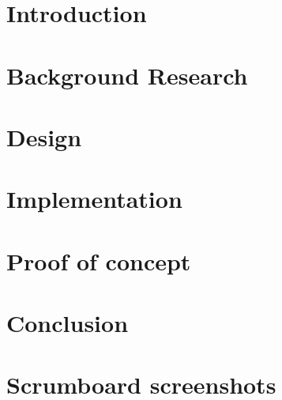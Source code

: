 \documentclass[]{report}
\begin{document}
\graphicspath{{img/}{../img/}}



\tableofcontents



\chapter{Introduction}


\chapter{Background Research}


\chapter{Design}


\chapter{Implementation}


\chapter{Proof of concept}


\chapter{Conclusion}




\appendix
\chapter{Scrumboard screenshots}



\end{document}
